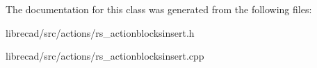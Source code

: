 The documentation for this class was generated from the following files\-:\begin{DoxyCompactItemize}
\item 
librecad/src/actions/rs\-\_\-actionblocksinsert.\-h\item 
librecad/src/actions/rs\-\_\-actionblocksinsert.\-cpp\end{DoxyCompactItemize}

